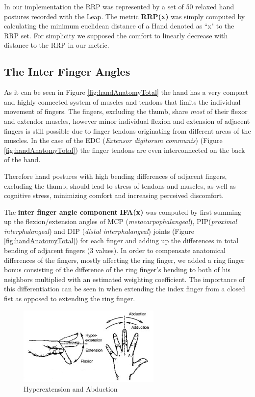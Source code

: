\documentclass{sig-alternate-05-2015}
\begin{document}
In our implementation the RRP was represented by a set of 50 relaxed hand postures recorded with the Leap. The metric \textbf{RRP(x)} was simply computed by calculating the minimum euclidean distance of a Hand denoted as ``x" to the RRP set.
For simplicity we supposed the comfort to linearly decrease with distance to the RRP in our metric.
\subsection{The Inter Finger Angles}

As it can be seen in Figure \ref{fig:handAnatomyTotal}
the hand has a very compact and highly connected system of muscles and tendons that limits the individual movement of fingers.
The fingers, excluding the thumb, share \textsl{most} of their flexor and extendor muscles, however minor individual flexion and extension of adjacent fingers is still possible due to finger tendons originating from different areas of the muscles. In the case of the EDC (\textit{Extensor digitorum communis}) (Figure \ref{fig:handAnatomyTotal}) the finger tendons are even interconnected on the back of the hand. 

Therefore hand postures with high bending differences of adjacent fingers, excluding the thumb, should lead to stress of tendons and muscles, as well as cognitive stress, minimizing comfort and increasing perceived discomfort.

The \textbf{inter finger angle component} \textbf{IFA(x)} was computed by first summing up the flexion/extension angles of MCP (\textit{metacarpophalangeal}), PIP(\textit{proximal interphalangeal}) and DIP (\textit{distal interphalangeal}) joints (Figure \ref{fig:handAnatomyTotal}) for each finger and adding up the differences in total bending of adjacent fingers (3 values). In order to compensate anatomical differences of the fingers, mostly affecting the ring finger, we added a ring finger bonus consisting of the difference of the ring finger's bending to both of his neighbors multiplied with an estimated weighting coefficient. The importance of this differentiation can be seen in when extending the index finger from a closed fist as opposed to extending the ring finger. 

\begin{figure}[b]
\centering
\includegraphics[width=7cm]{abduction}
\vspace{-20pt}
\caption{Hyperextension and Abduction}
\label{fig:hyperabduction}
\vspace{-10pt}
\end{figure}
\end{document}

